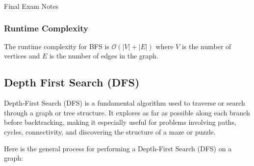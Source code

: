 \begin{examnotes}{Final Exam Notes}
    \subsubsection*{Runtime Complexity}

    The runtime complexity for BFS is $\mathcal{O}(|V| + |E|)$ where $V$ is the number of vertices and $E$ is the number of edges in the graph.

    \subsection*{Depth First Search (DFS)}

    Depth-First Search (DFS) is a fundamental algorithm used to traverse or search through a graph or tree structure. It explores as far as possible along each branch before backtracking, making it 
    especially useful for problems involving paths, cycles, connectivity, and discovering the structure of a maze or puzzle.

    \begin{highlight}
        Here is the general process for performing a Depth-First Search (DFS) on a graph:


\end{highlight}
\end{examnotes}

